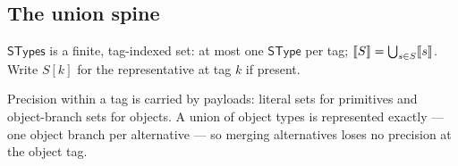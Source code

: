 \documentclass[11pt]{article}
\newcommand{\SType}{\mathsf{SType}}
\newcommand{\STypes}{\mathsf{STypes}}
\begin{document}
\subsection{The union spine}

\begin{definition}[STypes]
\label{def:stypes}
$\STypes$ is a finite, tag-indexed set: at most one $\SType$ per tag;
$\llbracket S \rrbracket = \bigcup_{s \in S}\llbracket s \rrbracket$. Write $S[k]$ for the representative at
tag $k$ if present.
\end{definition}

Precision within a tag is carried by payloads: literal sets for primitives
and object-branch sets for objects. A union of object types is represented
exactly — one object branch per alternative — so merging alternatives loses
no precision at the object tag.
\end{document}
